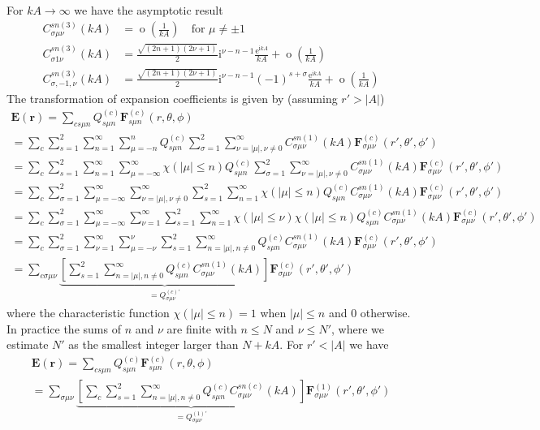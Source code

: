 \documentclass[a4paper,12pt]{article}
\renewcommand{\vec}[1]{\boldsymbol{#1}}
\newcommand{\mrm}[1]{\mathrm{#1}}
\newcommand{\iu}{\mrm{i}}
\newcommand{\eu}{\mrm{e}}
\newcommand{\Ev}{\vec{E}}
\newcommand{\Fv}{\vec{F}}
\newcommand{\rv}{\vec{r}}
\newcommand{\ordo}{\operatorname{o}}
\begin{document}
\begin{itemize}
  For $kA\rightarrow\infty$ we have the asymptotic result
  \begin{align}
    C_{\sigma\mu\nu}^{sn(3)}(kA) &= \ordo\left(\frac{1}{kA}\right) \quad \text{for $\mu\neq\pm1$} \\
    C_{\sigma1\nu}^{sn(3)}(kA) &= \frac{\sqrt{(2n+1)(2\nu+1)}}{2} \iu^{\nu-n-1} \frac{\eu^{\iu kA}}{kA} + \ordo\left(\frac{1}{kA}\right) \\
    C_{\sigma,-1,\nu}^{sn(3)}(kA) &= \frac{\sqrt{(2n+1)(2\nu+1)}}{2} \iu^{\nu-n-1} (-1)^{s+\sigma} \frac{\eu^{\iu kA}}{kA} + \ordo\left(\frac{1}{kA}\right)     
  \end{align}
  The transformation of expansion coefficients is given by (assuming
  $r'>|A|$)
  \begin{multline}
    \Ev(\rv) = \sum_{cs\mu n} Q_{s\mu n}^{(c)}\Fv_{s\mu n}^{(c)}(r,\theta,\phi) \\
    = \sum_{c}\sum_{s=1}^{2}\sum_{n=1}^{\infty}\sum_{\mu=-n}^{n} Q_{s\mu n}^{(c)}\sum_{\sigma=1}^{2}\sum_{\nu=|\mu|,\nu\neq0}^{\infty} C_{\sigma\mu\nu}^{sn(1)}(kA)\Fv_{\sigma\mu\nu}^{(c)}(r',\theta',\phi') \\
    = \sum_{c}\sum_{s=1}^{2}\sum_{n=1}^{\infty}\sum_{\mu=-\infty}^{\infty} \chi(|\mu|\leq n)Q_{s\mu n}^{(c)}\sum_{\sigma=1}^{2}\sum_{\nu=|\mu|,\nu\neq0}^{\infty} C_{\sigma\mu\nu}^{sn(1)}(kA)\Fv_{\sigma\mu\nu}^{(c)}(r',\theta',\phi') \\
    = \sum_{c}\sum_{\sigma=1}^{2}\sum_{\mu=-\infty}^{\infty}\sum_{\nu=|\mu|,\nu\neq0}^{\infty}\sum_{s=1}^{2}\sum_{n=1}^{\infty} \chi(|\mu|\leq n)Q_{s\mu n}^{(c)} C_{\sigma\mu\nu}^{sn(1)}(kA)\Fv_{\sigma\mu\nu}^{(c)}(r',\theta',\phi') \\
    = \sum_{c}\sum_{\sigma=1}^{2}\sum_{\mu=-\infty}^{\infty}\sum_{\nu=1}^{\infty}\sum_{s=1}^{2}\sum_{n=1}^{\infty} \chi(|\mu|\leq\nu)\chi(|\mu|\leq n)Q_{s\mu n}^{(c)} C_{\sigma\mu\nu}^{sn(1)}(kA)\Fv_{\sigma\mu\nu}^{(c)}(r',\theta',\phi') \\
    = \sum_{c}\sum_{\sigma=1}^{2}\sum_{\nu=1}^{\infty}\sum_{\mu=-\nu}^{\nu}\sum_{s=1}^{2}\sum_{n=|\mu|,n\neq0}^{\infty} Q_{s\mu n}^{(c)} C_{\sigma\mu\nu}^{sn(1)}(kA)\Fv_{\sigma\mu\nu}^{(c)}(r',\theta',\phi') \\
    = \sum_{c\sigma\mu\nu} \underbrace{\left[\sum_{s=1}^{2}\sum_{n=|\mu|,n\neq0}^{\infty}Q_{s\mu n}^{(c)}C_{\sigma\mu\nu}^{sn(1)}(kA)\right]}_{=Q_{\sigma\mu\nu}^{(c)'}} \Fv_{\sigma\mu\nu}^{(c)}(r',\theta',\phi')
  \end{multline}
  where the characteristic function $\chi(|\mu|\leq n)=1$ when
  $|\mu|\leq n$ and 0 otherwise. In practice the sums of $n$ and $\nu$
  are finite with $n\leq N$ and $\nu\leq N'$, where we estimate $N'$ as
  the smallest integer larger than $N + kA$. For $r'<|A|$ we have
  \begin{multline}
    \Ev(\rv) = \sum_{cs\mu n} Q_{s\mu n}^{(c)}\Fv_{s\mu n}^{(c)}(r,\theta,\phi) \\
    = \sum_{\sigma\mu\nu} \underbrace{\left[\sum_{c}\sum_{s=1}^{2}\sum_{n=|\mu|,n\neq0}^{\infty}Q_{s\mu n}^{(c)}C_{\sigma\mu\nu}^{sn(c)}(kA)\right]}_{=Q_{\sigma\mu\nu}^{(1)'}} \Fv_{\sigma\mu\nu}^{(1)}(r',\theta',\phi')
  \end{multline}


\end{itemize}
\end{document}
